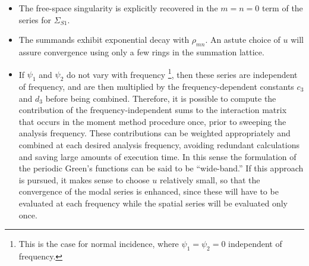 \begin{itemize}
\item The free-space singularity is explicitly recovered in the $m=n=0$
term of the series for $\Sigma_{S1}$.
\item The summands exhibit exponential decay with $\rho_{mn}$.  An
  astute choice of $u$ will assure convergence using only a few rings
  in the summation lattice.
\item If $\psi_1$ and $\psi_2$ do not vary with frequency%
  \footnote{This is the case for normal incidence, where
    $\psi_1 = \psi_2 = 0$ independent of frequency.},
  then these series are independent of frequency, and are
  then multiplied by the frequency-dependent constants $c_3$ and $d_3$
  before being combined.  Therefore, it is possible to compute the
  contribution of the frequency-independent sums to the interaction
  matrix that occurs in the moment method procedure once, prior to
  sweeping the analysis frequency.  These contributions can be
  weighted appropriately and combined at each desired analysis
  frequency, avoiding redundant calculations and saving large amounts
  of execution time.  In this sense the formulation of the periodic
  Green's functions can be said to be ``wide-band.''  If this approach
  is pursued, it makes sense to choose $u$ relatively small, so that
  the convergence of the modal series is enhanced, since these will
  have to be evaluated at each frequency while the spatial series will
  be evaluated only once.
\end{itemize}
